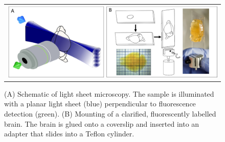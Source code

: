 \documentclass[12pt]{spieman}  %
\begin{document}
\begin{figure}
   \begin{center}
   \begin{tabular}{c}
   \includegraphics[width=\textwidth]{PanelSampel.eps}
   \end{tabular}
   \end{center}
   \caption{\label{fig:Panel0} (A) Schematic of light sheet microscopy. The sample is illuminated with a planar light sheet (blue) perpendicular to fluorescence detection (green). (B) Mounting of a clarified, fluorescently labelled brain. The brain is glued onto a coverslip and inserted into an adapter that slides into a Teflon cylinder.} 
   \end{figure}
\end{document}
